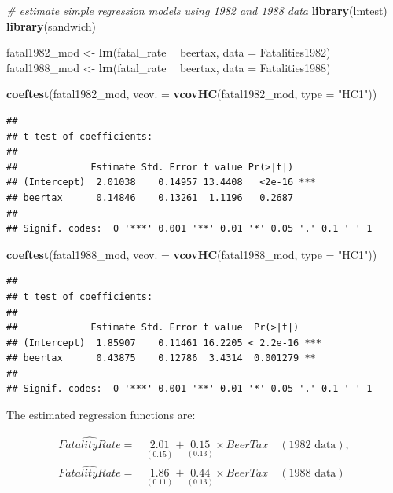 \documentclass[]{book}
\newenvironment{Shaded}{\begin{snugshade}}{\end{snugshade}}
\newcommand{\KeywordTok}[1]{\textcolor[rgb]{0.13,0.29,0.53}{\textbf{#1}}}
\newcommand{\DataTypeTok}[1]{\textcolor[rgb]{0.13,0.29,0.53}{#1}}
\newcommand{\StringTok}[1]{\textcolor[rgb]{0.31,0.60,0.02}{#1}}
\newcommand{\CommentTok}[1]{\textcolor[rgb]{0.56,0.35,0.01}{\textit{#1}}}
\newcommand{\OperatorTok}[1]{\textcolor[rgb]{0.81,0.36,0.00}{\textbf{#1}}}
\newcommand{\NormalTok}[1]{#1}
\theoremstyle{definition}
\theoremstyle{definition}
\theoremstyle{definition}
\theoremstyle{remark}
\begin{document}
\begin{Shaded}
\begin{Highlighting}[]
\CommentTok{# estimate simple regression models using 1982 and 1988 data}
\KeywordTok{library}\NormalTok{(lmtest)}
\KeywordTok{library}\NormalTok{(sandwich)}

\NormalTok{fatal1982_mod <-}\StringTok{ }\KeywordTok{lm}\NormalTok{(fatal_rate }\OperatorTok{~}\StringTok{ }\NormalTok{beertax, }\DataTypeTok{data =}\NormalTok{ Fatalities1982)}
\NormalTok{fatal1988_mod <-}\StringTok{ }\KeywordTok{lm}\NormalTok{(fatal_rate }\OperatorTok{~}\StringTok{ }\NormalTok{beertax, }\DataTypeTok{data =}\NormalTok{ Fatalities1988)}

\KeywordTok{coeftest}\NormalTok{(fatal1982_mod, }\DataTypeTok{vcov. =} \KeywordTok{vcovHC}\NormalTok{(fatal1982_mod, }\DataTypeTok{type =} \StringTok{"HC1"}\NormalTok{))}
\end{Highlighting}
\end{Shaded}

\begin{verbatim}
## 
## t test of coefficients:
## 
##             Estimate Std. Error t value Pr(>|t|)    
## (Intercept)  2.01038    0.14957 13.4408   <2e-16 ***
## beertax      0.14846    0.13261  1.1196   0.2687    
## ---
## Signif. codes:  0 '***' 0.001 '**' 0.01 '*' 0.05 '.' 0.1 ' ' 1
\end{verbatim}

\begin{Shaded}
\begin{Highlighting}[]
\KeywordTok{coeftest}\NormalTok{(fatal1988_mod, }\DataTypeTok{vcov. =} \KeywordTok{vcovHC}\NormalTok{(fatal1988_mod, }\DataTypeTok{type =} \StringTok{"HC1"}\NormalTok{))}
\end{Highlighting}
\end{Shaded}

\begin{verbatim}
## 
## t test of coefficients:
## 
##             Estimate Std. Error t value  Pr(>|t|)    
## (Intercept)  1.85907    0.11461 16.2205 < 2.2e-16 ***
## beertax      0.43875    0.12786  3.4314  0.001279 ** 
## ---
## Signif. codes:  0 '***' 0.001 '**' 0.01 '*' 0.05 '.' 0.1 ' ' 1
\end{verbatim}

The estimated regression functions are:

\begin{align*}
  \widehat{FatalityRate} =& \, \underset{(0.15)}{2.01} + \underset{(0.13)}{0.15} \times BeerTax \quad (1982 \text{ data}), \\
  \widehat{FatalityRate} =& \, \underset{(0.11)}{1.86} + \underset{(0.13)}{0.44} \times BeerTax \quad (1988 \text{ data})
\end{align*}
\end{document}
